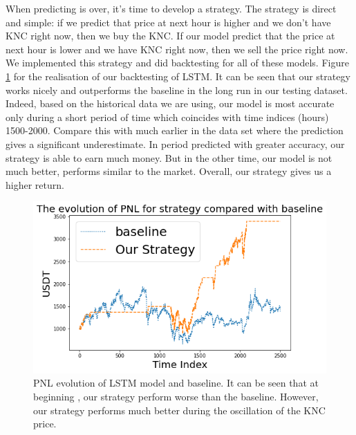 \documentclass[twoside]{report}
\begin{document}
\begin{spacing}{1}
When predicting is over, it's time to develop a strategy. The strategy is direct and simple: if we predict that price at next hour is higher and we don't have KNC right now, then we buy the KNC. If our model predict that the price at next hour is lower and we have KNC right now, then we sell the price right now. We implemented this strategy and did backtesting for all of these models.
Figure \ref{fig:LSTM PNL} for the realisation of our backtesting of LSTM. It can be seen that our strategy works nicely and outperforms the baseline in the long run in our testing dataset. Indeed, based on the historical data we are using, our model is most accurate only during a short period of time which coincides with time indices (hours) 1500-2000. Compare this with much earlier in the data set where the prediction gives a significant underestimate. In period predicted with greater accuracy, our strategy is able to earn much money. But in the other time, our model is not much better, performs similar to the market. Overall, our strategy gives us a higher return.
\begin{figure}[!ht]
    \centering
    \includegraphics[scale = 0.7]{Images/LSTM PNL.png}
    \caption{PNL evolution of LSTM model and baseline. It can be seen that at beginning , our strategy perform worse than the baseline. However, our strategy performs much better during the oscillation of the KNC price.}
    \label{fig:LSTM PNL}
\end{figure}


\end{spacing}
\end{document}
